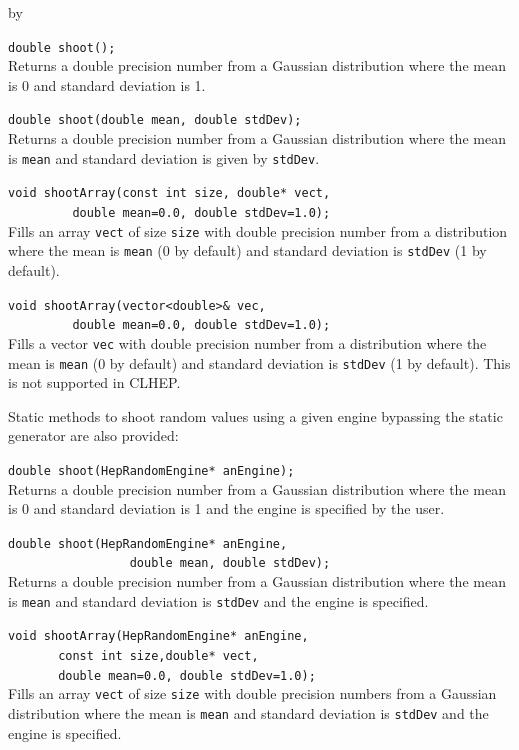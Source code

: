 \documentclass[twoside]{article}
\newcommand{\comp}[1]{\texttt{#1}}%
\newcommand{\entrylabel}[1]{\mbox{\textbf{{#1}}}\hfil}%
\newenvironment{entry}
{\begin{list}{}%
    {\renewcommand{\makelabel}{\entrylabel}%
     \setlength{\labelwidth}{90pt}%
     \setlength{\leftmargin}{\labelwidth}
     \advance\leftmargin by \labelsep%
      }%
    }%
  {\end{list}}
\newcommand{\Entrylabel}[1]%
{\raisebox{0pt}[1ex][0pt]{\makebox[\labelwidth][l]%
    {\parbox[t]{\labelwidth}{\hspace{0pt}\textbf{{#1}}}}}}
\newenvironment{Entry}%
{\renewcommand{\entrylabel}{\Entrylabel}\begin{entry}}%
  {\end{entry}}
\begin{document}
\begin{Entry}
   \verb+double shoot();+\\
   Returns a double precision number from a Gaussian distribution where the
   mean is 0 and standard deviation is 1.
  
   \verb+double shoot(double mean, double stdDev);+\\
   Returns a double precision number from a Gaussian distribution where the
   mean is \comp{mean} and standard deviation is given by
   \comp{stdDev}.

  \verb+void shootArray(const int size, double* vect,+\\
  \verb+         double mean=0.0, double stdDev=1.0);+\\
  Fills an array \comp{vect} of size \comp{size} with double
  precision number from a distribution where the
  mean is \comp{mean} (0 by default) and standard
  deviation is \comp{stdDev} (1 by default).

  \verb+void shootArray(vector<double>& vec,+\\
  \verb+         double mean=0.0, double stdDev=1.0);+\\
  Fills a vector \comp{vec} with double
  precision number from a distribution where the
  mean is \comp{mean} (0 by default) and standard
  deviation is \comp{stdDev} (1 by default).  This is not
  supported in CLHEP.
  
  Static methods to shoot random values using a given engine
  bypassing the static generator are also provided:

  \verb+double shoot(HepRandomEngine* anEngine);+\\
  Returns a double precision number from a Gaussian distribution where the
  mean is 0 and standard deviation is 1
  and the engine is specified by the user.
  
  \verb+double shoot(HepRandomEngine* anEngine,+\\ 
  \verb+                 double mean, double stdDev);+\\
  Returns a double precision number from a Gaussian distribution where the
  mean is \comp{mean} and standard deviation is \comp{stdDev}
  and the engine is specified.

  \verb+void shootArray(HepRandomEngine* anEngine,+\\
  \verb+       const int size,double* vect,+\\ 
  \verb+       double mean=0.0, double stdDev=1.0);+\\
  Fills an array \comp{vect} of size \comp{size} with double precision
  numbers from a Gaussian distribution where the
  mean is \comp{mean} and standard deviation is \comp{stdDev}
  and the engine is specified.


\end{Entry}
\end{document}
